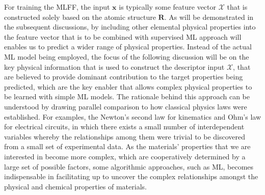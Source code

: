 For training the MLFF, the input $\bm{x}$ is typically some feature vector $\mathcal{X}$ that is constructed solely based on the atomic structure $\bm{R}$. As will be demonstrated in the subsequent discussions, by including other elemental physical properties into the feature vector that is to be combined with supervised ML approach will enables us to predict a wider range of physical properties. %
Instead of the actual ML model being employed, the focus of the following discussion will be on the key physical information that is used to construct the descriptor input $\mathcal{X}$, that are believed to provide dominant contribution to the target properties being predicted, which are the key enabler that allows complex physical properties to be learned with simple ML models. The rationale behind this approach can be understood by drawing parallel comparison to how classical physics laws were established. For examples, the Newton's second law for kinematics and Ohm's law for electrical circuits, in which there exists a small number of interdependent variables whereby the relationships among them were trivial to be discovered from a small set of experimental data. As the materials' properties that we are interested in become more complex, which are cooperatively determined by a large set of possible factors, some algorithmic approaches, such as ML, becomes indispensable in facilitating up to uncover the complex relationships amongst the physical and chemical properties of materials.

